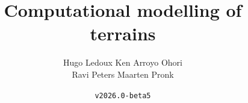\documentclass[
  fontsize=10pt, %
  twoside=true, %
  secnumdepth=1, %
  numbers=noenddot, %
]{kaobook}
\begin{document}


\title{Computational modelling of terrains}
\author{Hugo Ledoux \hspace{10mm} Ken Arroyo Ohori\\ Ravi Peters \hspace{17mm} Maarten Pronk}
\date{\texttt{v2026.0-beta5}}



\frontmatter %





\cleardoublepage







\maketitle

\end{document}
